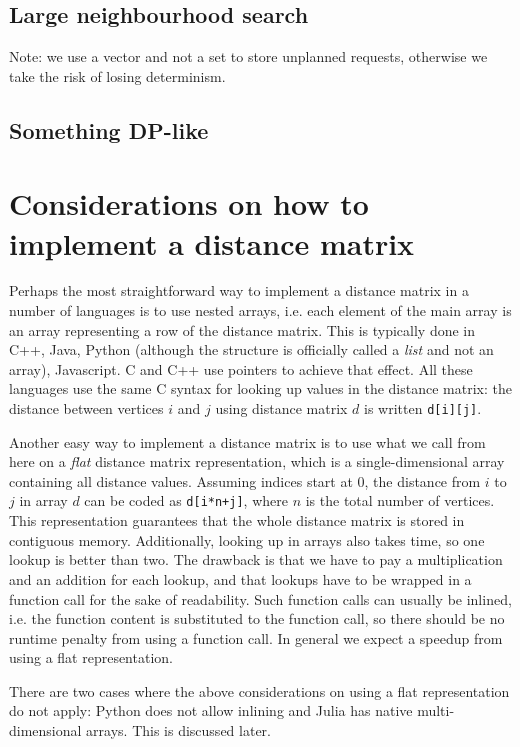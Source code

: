 \documentclass[11pt,a4paper,notitlepage]{article}
\begin{document}
\subsection{Large neighbourhood search}

Note: we use a vector and not a set to store unplanned requests,
otherwise we take the risk of losing determinism.

\subsection{Something DP-like}

\section{Considerations on how to implement a distance matrix}
Perhaps the most straightforward way to implement a distance matrix in
a number of languages is to use nested arrays, i.e. each element of the
main array is an array representing a row of the distance matrix. This
is typically done in C++, Java, Python (although the structure is
officially called a \emph{list} and not an array), Javascript. C and
C++ use pointers to achieve that effect. All these languages use the
same C syntax for looking up values in the distance matrix: the
distance between vertices $i$ and $j$ using distance matrix $d$ is
written \lstinline{d[i][j]}.

Another easy way to implement a distance matrix is to use what we
call from here on a \emph{flat} distance matrix representation, which
is a single-dimensional array containing all distance values. Assuming
indices start at 0, the distance from $i$ to $j$ in array $d$ can be
coded as \lstinline{d[i*n+j]}, where $n$ is the total number of
vertices. This representation guarantees that the whole distance
matrix is stored in contiguous memory. Additionally, looking up in
arrays also takes time, so one lookup is better than two. The drawback
is that we have to pay a multiplication and an addition for each
lookup, and that lookups have to be wrapped in a function call for the
sake of readability. Such function calls can usually be inlined,
i.e. the function content is substituted to the function call, so
there should be no runtime penalty from using a function call. In
general we expect a speedup from using a flat representation.

There are two cases where the above considerations on using a flat
representation do not apply: Python does not allow inlining and Julia
has native multi-dimensional arrays. This is discussed later.
\end{document}
